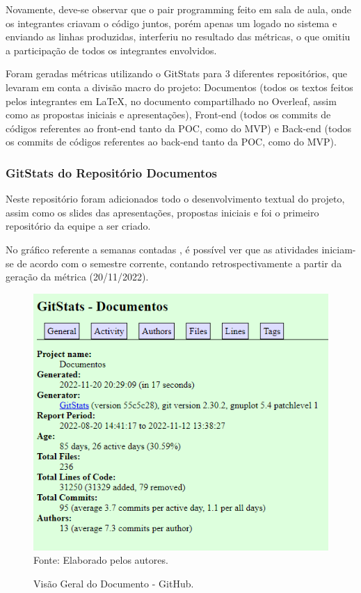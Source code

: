 \documentclass[
    12pt,               %
    openright,          %
    oneside,
    a4paper,            %
    BIBLATEX,           %
    TODO,               %
    english,            %
    brazil              %
    ]{ifsp-spo-inf-ctds}
\begin{document}
    Novamente, deve-se observar que o pair programming feito em sala de aula, onde os integrantes criavam o código juntos, porém apenas um logado no sistema e enviando as linhas produzidas, interferiu no resultado das métricas, o que omitiu a participação de todos os integrantes envolvidos.
    
    Foram geradas métricas utilizando o GitStats para 3 diferentes repositórios, que levaram em conta a divisão macro do projeto: Documentos (todos os textos feitos pelos integrantes em LaTeX, no documento compartilhado no Overleaf, assim como as propostas iniciais e apresentações), Front-end (todos os commits de códigos referentes ao front-end tanto da POC, como do MVP) e Back-end (todos os commits de códigos referentes ao back-end tanto da POC, como do MVP).
    
    
    \subsubsection{GitStats do Repositório Documentos}
    
    Neste repositório foram adicionados todo o desenvolvimento textual do projeto, assim como os slides das apresentações, propostas iniciais e foi o primeiro repositório da equipe a ser criado. 
    
    No gráfico referente a semanas contadas , é possível ver que as atividades iniciam-se de acordo com o semestre corrente, contando retrospectivamente a partir da geração da métrica (20/11/2022).
    
    \begin{figure}[H]
                \centering
                \caption{Visão Geral do Documento - GitHub.}
                \includegraphics[width=1 \textwidth]{Gitstats/documento/geralDoc.png}
                {\footnotesize Fonte: Elaborado pelos autores.}
                \label{fig:geralDoc}
            \end{figure}
    
\end{document}
